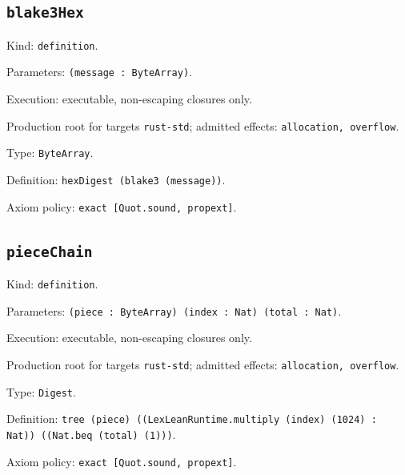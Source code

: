 \documentclass[11pt]{article}
\begin{document}
\subsection*{\texttt{blake3Hex}}
\noindent Kind: \texttt{definition}.\par
\noindent Parameters: \texttt{(message : ByteArray)}.\par
\noindent Execution: executable, non-escaping closures only.\par
\noindent Production root for targets \texttt{rust-std}; admitted effects: \texttt{allocation, overflow}.\par
\noindent Type: \texttt{ByteArray}.\par
\noindent Definition: \texttt{hexDigest (blake3 (message))}.\par
\noindent Axiom policy: \texttt{exact [Quot.sound, propext]}.\par
\subsection*{\texttt{pieceChain}}
\noindent Kind: \texttt{definition}.\par
\noindent Parameters: \texttt{(piece : ByteArray) (index : Nat) (total : Nat)}.\par
\noindent Execution: executable, non-escaping closures only.\par
\noindent Production root for targets \texttt{rust-std}; admitted effects: \texttt{allocation, overflow}.\par
\noindent Type: \texttt{Digest}.\par
\noindent Definition: \texttt{tree (piece) ((LexLeanRuntime.multiply (index) (1024) : Nat)) ((Nat.beq (total) (1)))}.\par
\noindent Axiom policy: \texttt{exact [Quot.sound, propext]}.\par
\end{document}
